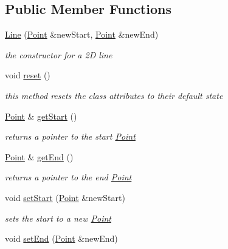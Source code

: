 \subsection*{Public Member Functions}
\begin{DoxyCompactItemize}
\item 
\mbox{\hyperlink{class_jinks_draw_1_1_line_a0a01ff362d3d5cb6de257cdc59fdbd7a}{Line}} (\mbox{\hyperlink{class_jinks_draw_1_1_point}{Point}} \&new\+Start, \mbox{\hyperlink{class_jinks_draw_1_1_point}{Point}} \&new\+End)
\begin{DoxyCompactList}\small\item\em the constructor for a 2D line \end{DoxyCompactList}\item 
void \mbox{\hyperlink{class_jinks_draw_1_1_line_a95823711fb1ebc27435aff387c42b577}{reset}} ()
\begin{DoxyCompactList}\small\item\em this method resets the class attributes to their default state \end{DoxyCompactList}\item 
\mbox{\hyperlink{class_jinks_draw_1_1_point}{Point}} \& \mbox{\hyperlink{class_jinks_draw_1_1_line_a0457130d0cee09aa589c387cd7ed4b59}{get\+Start}} ()
\begin{DoxyCompactList}\small\item\em returns a pointer to the start \mbox{\hyperlink{class_jinks_draw_1_1_point}{Point}} \end{DoxyCompactList}\item 
\mbox{\hyperlink{class_jinks_draw_1_1_point}{Point}} \& \mbox{\hyperlink{class_jinks_draw_1_1_line_a6d0c3c1b398bbe5dcadecaff9e71720b}{get\+End}} ()
\begin{DoxyCompactList}\small\item\em returns a pointer to the end \mbox{\hyperlink{class_jinks_draw_1_1_point}{Point}} \end{DoxyCompactList}\item 
void \mbox{\hyperlink{class_jinks_draw_1_1_line_a5afb8d3fa0f0b47529014dbfb5e9dbb6}{set\+Start}} (\mbox{\hyperlink{class_jinks_draw_1_1_point}{Point}} \&new\+Start)
\begin{DoxyCompactList}\small\item\em sets the start to a new \mbox{\hyperlink{class_jinks_draw_1_1_point}{Point}} \end{DoxyCompactList}\item 
void \mbox{\hyperlink{class_jinks_draw_1_1_line_affea1d620e660a388d30808ac9404457}{set\+End}} (\mbox{\hyperlink{class_jinks_draw_1_1_point}{Point}} \&new\+End)

\end{DoxyCompactItemize}
